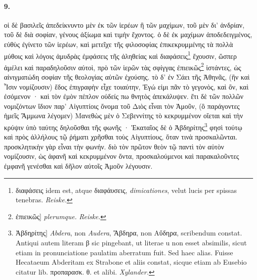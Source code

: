 \documentclass[a4paper, 11pt, oneside, polutonikogreek, german, landscape]{article}
\begin{document}
\paragraph{9.}
οἱ δὲ βασιλεῖς ἀπεδείκνυντο μὲν ἐκ τῶν ἱερέων ἢ τῶν μαχίμων, τοῦ μὲν δι' ἀνδρίαν, τοῦ δὲ διὰ σοφίαν, γένους ἀξίωμα καὶ τιμὴν ἔχοντος. ὁ δὲ ἐκ μαχίμων ἀποδεδειγμένος, εὐθὺς ἐγίνετο τῶν ἱερέων, καὶ μετεῖχε τῆς φιλοσοφίας ἐπικεκρυμμένης τὰ πολλὰ μύθοις καὶ λόγοις ἀμυδρὰς ἐμφάσεις τῆς ἀληθείας καὶ διαφάσεις\footnote{διαφάσεις idem est, atque διαφάυσεις, \emph{dimicationes}, velut lucis per spissas tenebras. \emph{Reiske.}} ἔχουσιν, ὥσπερ ἀμέλει καὶ παραδηλοῦσιν αὐτοὶ, πρὸ τῶν ἱερῶν τὰς σφίγγας ἐπιεικῶς\footnote{ἐπιεικῶς] \emph{plerumque.} \emph{Reiske.}} ἱστάντες, ὡς αἰνιγματώδη σοφίαν τῆς θεολογίας αὐτῶν ἐχούσης. τὸ δ' ἐν Σάει τῆς Ἀθηνᾶς, (ἣν καὶ Ἶσιν νομίζουσιν) ἕδος ἐπιγραφὴν εἶχε τοιαύτην, Ἐγώ εἰμι πᾶν τὸ γεγονὸς, καὶ ὂν, καὶ ἐσόμενον · καὶ τὸν ἐμὸν πέπλον οὐδείς πω θνητὸς ἀπεκάλυψεν. ἔτι δὲ τῶν πολλῶν νομιζόντων ἴδιον παρ' Αἰγυπτίοις ὄνομα τοῦ Διὸς εἶναι τὸν Ἀμοῦν, (ὃ παράγοντες ἡμεῖς Ἄμμωνα λέγομεν) Μανεθὼς μὲν ὁ Σεβεννίτης τὸ κεκρυμμένον οἴεται καὶ τὴν κρύψιν ὑπὸ ταύτης δηλοῦσθαι τῆς φωνῆς · Ἑκαταῖος δὲ ὁ Ἀβδηρίτης\footnote{Ἀβδηρίτης] \emph{Abdera}, non \emph{Audera}, Ἄβδηρα, non Αὔδηρα, scribendum constat. Antiqui autem literam β sic pingebant, ut literae u non esset absimilis, sicut etiam in pronunciatione paulatim aberratum fuit. Sed haec alias. Fuisse Hecataeum Abderitam ex Strabone et aliis constat, sicque etiam ab Eusebio citatur lib. προπαρασκ. θ. et alibi. \emph{Xylander.}} φησὶ τούτῳ καὶ πρὸς ἀλλήλους τῷ ῥήματι χρῆσθαι τοὺς Αἰγυπτίους, ὅταν τινὰ προσκαλῶνται. προσκλητικὴν γὰρ εἶναι τὴν φωνήν. διὸ τὸν πρῶτον θεὸν τῷ παντὶ τὸν αὐτὸν νομίζουσιν, ὡς ἀφανῆ καὶ κεκρυμμένον ὄντα, προσκαλούμενοι καὶ παρακαλοῦντες ἐμφανῆ γενέσθαι καὶ δῆλον αὐτοῖς Ἀμοῦν λέγουσιν.
\end{document}
